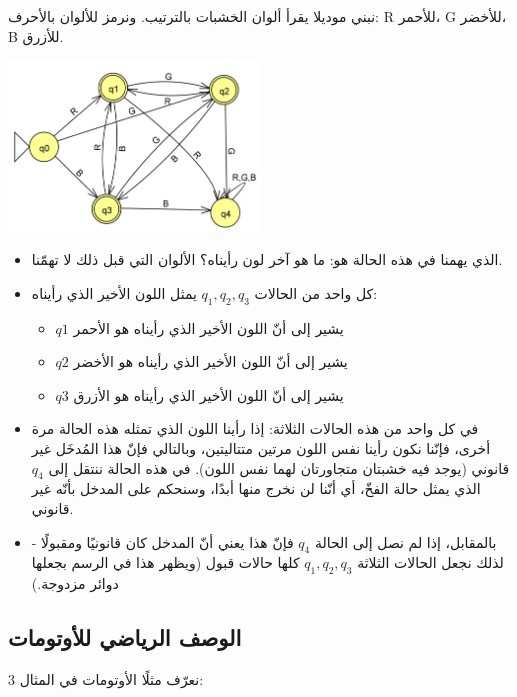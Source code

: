 ﻿\documentclass[12pt]{article}
\begin{document}
نبني موديلا يقرأ ألوان الخشبات بالترتيب. ونرمز للألوان بالأحرف: R للأحمر، G للأخضر، B للأزرق.

\begin{center}
\includegraphics[width=0.5\textwidth]{../../../images/DFAs/03_color_series_dfa.png}
\end{center}

\begin{itemize}
    \item الذي يهمنا في هذه الحالة هو: ما هو آخر لون رأيناه؟ الألوان التي قبل ذلك لا تهمّنا.
    \item كل واحد من الحالات $q_1, q_2, q_3$ يمثل اللون الأخير الذي رأيناه:
    \begin{itemize}
        \item $q1$ يشير إلى أنّ اللون الأخير الذي رأيناه هو الأحمر
        \item $q2$ يشير إلى أنّ اللون الأخير الذي رأيناه هو الأخضر
        \item $q3$ يشير إلى أنّ اللون الأخير الذي رأيناه هو الأزرق
    \end{itemize}
    \item في كل واحد من هذه الحالات الثلاثة: إذا رأينا اللون الذي تمثله هذه الحالة مرة أخرى، فإنّنا نكون رأينا نفس اللون مرتين متتاليتين، وبالتالي فإنّ هذا المُدخَل غير قانوني (يوجد فيه خشبتان متجاورتان لهما نفس اللون).
    في هذه الحالة ننتقل إلى $q_4$ الذي يمثل حالة الفخّ، أي أنّنا لن نخرج منها أبدًا، وسنحكم على المدخل بأنّه غير قانوني.
    \item بالمقابل، إذا لم نصل إلى الحالة $q_4$ فإنّ هذا يعني أنّ المدخل كان قانونيًا ومقبولًا - لذلك نجعل الحالات الثلاثة $q_1, q_2, q_3$ كلها حالات قبول (ويظهر هذا في الرسم بجعلها دوائر مزدوجة.)
\end{itemize}


\subsection{الوصف الرياضي للأوتومات}

نعرّف مثلًا الأوتومات في المثال 3:
\end{document}
